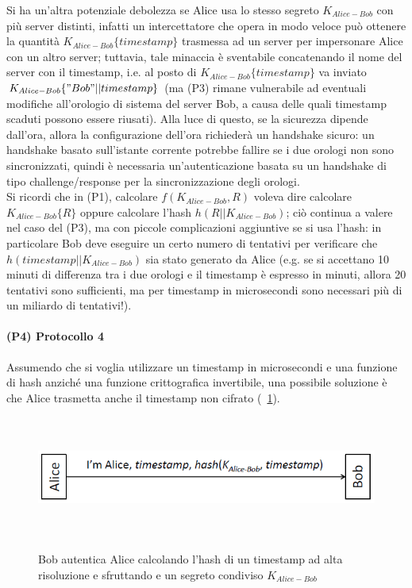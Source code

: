 Si ha un'altra potenziale debolezza se Alice usa lo stesso segreto $K_{Alice-Bob}$ con più server distinti, infatti un intercettatore che opera in modo veloce può ottenere la quantità $K_{Alice-Bob}\lbrace timestamp\rbrace$ trasmessa ad un server per impersonare Alice con un altro server; tuttavia, tale minaccia è sventabile concatenando il nome del
server con il timestamp, i.e. al posto di $K_{Alice-Bob}\lbrace timestamp\rbrace$ va inviato $K_{Alice-Bob}\lbrace "Bob"||timestamp\rbrace$ (ma (P3) rimane vulnerabile ad eventuali modifiche all'orologio di sistema del server Bob, a causa delle quali timestamp scaduti possono essere riusati). Alla luce di questo, se la sicurezza dipende dall'ora, allora la configurazione dell'ora richiederà un handshake sicuro: un handshake basato sull'istante corrente potrebbe fallire se i due orologi non sono sincronizzati, quindi è necessaria un'autenticazione basata su un handshake di tipo challenge/response per la sincronizzazione degli orologi.\\
Si ricordi che in (P1), calcolare $f(K_{Alice-Bob}, R)$ voleva dire calcolare $K_{Alice-Bob}\lbrace R\rbrace$ oppure calcolare l'hash $h(R||K_{Alice-Bob})$; ciò continua a valere nel caso del (P3), ma con piccole complicazioni aggiuntive se si usa l'hash: in particolare Bob deve eseguire un certo numero di tentativi per verificare che $h(timestamp||K_{Alice-Bob})$ sia stato generato da Alice (e.g. se si accettano 10 minuti di differenza tra i due orologi e il timestamp è espresso in minuti, allora 20 tentativi sono sufficienti, ma per timestamp in microsecondi sono necessari più di un miliardo di tentativi!).

\paragraph{(P4) Protocollo 4}
Assumendo che si voglia utilizzare un timestamp in microsecondi e una funzione di hash anziché una funzione crittografica invertibile, una possibile soluzione è che Alice trasmetta anche il timestamp non cifrato (\figurename~\ref{fig:ImgS25bis}).
\begin{figure}[htbp]
	\centering%
	\subfigure%
	{\includegraphics[height=4cm, width=12cm, keepaspectratio]{Immagini/autenticazione/ImgS25bis.png}}
	\caption{Bob autentica Alice calcolando l’hash di un timestamp ad alta risoluzione e sfruttando e un segreto condiviso $K_{Alice-Bob}$\label{fig:ImgS25bis}} 	
\end{figure}

